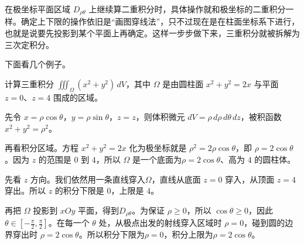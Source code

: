 在极坐标平面区域 \(D_{\rho\theta}\) 上继续算二重积分时，具体操作就和极坐标的二重积分一样。确定上下限的操作依旧是“画图穿线法”，只不过现在是在柱面坐标系下进行，也就是说要先投影到某个平面上再确定。这样一步步做下来，三重积分就被拆解为三次定积分。

下面看几个例子。

\begin{myexample}
    计算三重积分 \(\iiint_{\Omega} (x^2+y^2)\,dV\)，其中 \(\Omega\) 是由圆柱面 \(x^2+y^2=2x\) 与平面 \(z=0\)、\(z=4\) 围成的区域。

    先令 \(x=\rho\cos\theta\)，\(y=\rho\sin\theta\)，\(z=z\)，则体积微元 \(dV=\rho\,d\rho\,d\theta\,dz\)，被积函数 \(x^2+y^2=\rho^2\)。

    再看积分区域。方程 \(x^2+y^2=2x\) 化为极坐标就是 \(\rho^2=2\rho\cos\theta\)，即 \(\rho=2\cos\theta\)。因为 \(z\) 的范围是 \(0\) 到 \(4\)，所以 \(\Omega\) 是一个底面为\(\rho=2\cos\theta\)、高为 \(4\) 的圆柱体。

    先看 \(z\) 方向。我们依然用一条直线穿入\(\Omega\)，直线从底面 \(z=0\) 穿入，从顶面 \(z=4\) 穿出。所以 \(z\) 的积分下限是 \(0\)，上限是 \(4\)。
    
    再把 \(\Omega\) 投影到 \(xOy\) 平面，得到\(D_{\rho\theta}\)。为保证 \(\rho\ge0\)，所以 \(\cos\theta\ge0\)，因此 \(\theta \in [-\frac{\pi}{2},\frac{\pi}{2}]\)。在每一个 \(\theta\) 处，从极点出发的射线穿入区域时 \(\rho=0\)，碰到圆的边界穿出时 \(\rho=2\cos\theta\)。所以积分下限为\(\rho=0\)，积分上限为\(\rho=2\cos\theta\)。

    \begin{center}
\end{center}


\end{myexample}
